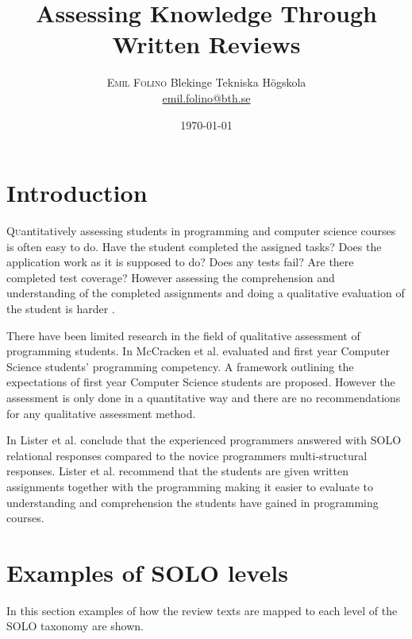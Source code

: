 \documentclass[twoside,twocolumn,a4paper,11pt,english]{article}
\title{Assessing Knowledge Through Written Reviews} %
\author{%
\textsc{Emil Folino} %
\normalsize Blekinge Tekniska Högskola \\ %
\normalsize \href{mailto:emil.folino@bth.se}{emil.folino@bth.se} %
}
\date{\today} %
\begin{document}
\maketitle


\section{Introduction}

\lettrine[nindent=0em,lines=3]{Q}uantitatively assessing students in programming and computer science courses is often easy to do. Have the student completed the assigned tasks? Does the application work as it is supposed to do? Does any tests fail? Are there completed test coverage? However assessing the comprehension and understanding of the completed assignments and doing a qualitative evaluation of the student is harder \cite{biggs1982evaluation}.

There have been limited research in the field of qualitative assessment of programming students. In \cite{mccracken2001multi} McCracken et al. evaluated and first year Computer Science students' programming competency. A framework outlining the expectations of first year Computer Science  students are proposed. However the assessment is only done in a quantitative way and there are no recommendations for any qualitative assessment method.

In \cite{lister2006not} Lister et al. conclude that the experienced programmers answered with SOLO relational responses compared to the novice programmers multi-structural responses. Lister et al. recommend that the students are given written assignments together with the programming making it easier to evaluate to understanding and comprehension the students have gained in programming courses.




\section{Examples of SOLO levels}

In this section examples of how the review texts are mapped to each level of the SOLO taxonomy are shown.
\end{document}
